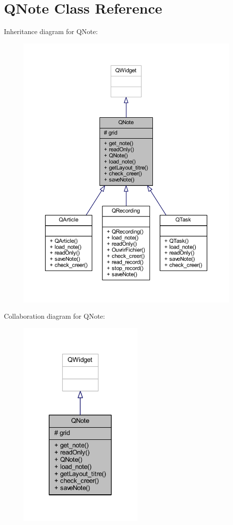 \hypertarget{class_q_note}{}\section{Q\+Note Class Reference}
\label{class_q_note}


Inheritance diagram for Q\+Note\+:
\nopagebreak
\begin{figure}[H]
\begin{center}
\leavevmode
\includegraphics[width=350pt]{class_q_note__inherit__graph}
\end{center}
\end{figure}


Collaboration diagram for Q\+Note\+:
\nopagebreak
\begin{figure}[H]
\begin{center}
\leavevmode
\includegraphics[width=176pt]{class_q_note__coll__graph}
\end{center}
\end{figure}
